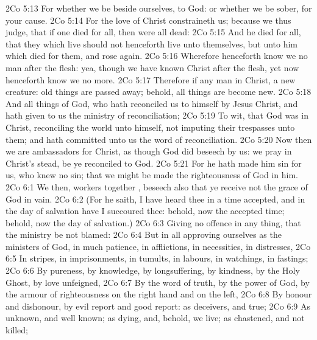 \vs 2Co 5:13 For whether we be beside ourselves,  to God: or whether we be sober,  for your cause.
\vs 2Co 5:14 For the love of Christ constraineth us; because we thus judge, that if one died for all, then were all dead:
\vs 2Co 5:15 And  he died for all, that they which live should not henceforth live unto themselves, but unto him which died for them, and rose again.
\vs 2Co 5:16 Wherefore henceforth know we no man after the flesh: yea, though we have known Christ after the flesh, yet now henceforth know we  no more.
\vs 2Co 5:17 Therefore if any man  in Christ,  a new creature: old things are passed away; behold, all things are become new.
\vs 2Co 5:18 And all things  of God, who hath reconciled us to himself by Jesus Christ, and hath given to us the ministry of reconciliation;
\vs 2Co 5:19 To wit, that God was in Christ, reconciling the world unto himself, not imputing their trespasses unto them; and hath committed unto us the word of reconciliation.
\vs 2Co 5:20 Now then we are ambassadors for Christ, as though God did beseech  by us: we pray  in Christ's stead, be ye reconciled to God.
\vs 2Co 5:21 For he hath made him  sin for us, who knew no sin; that we might be made the righteousness of God in him.
\vs 2Co 6:1 We then,  workers together , beseech  also that ye receive not the grace of God in vain.
\vs 2Co 6:2 (For he saith, I have heard thee in a time accepted, and in the day of salvation have I succoured thee: behold, now  the accepted time; behold, now  the day of salvation.)
\vs 2Co 6:3 Giving no offence in any thing, that the ministry be not blamed:
\vs 2Co 6:4 But in all  approving ourselves as the ministers of God, in much patience, in afflictions, in necessities, in distresses,
\vs 2Co 6:5 In stripes, in imprisonments, in tumults, in labours, in watchings, in fastings;
\vs 2Co 6:6 By pureness, by knowledge, by longsuffering, by kindness, by the Holy Ghost, by love unfeigned,
\vs 2Co 6:7 By the word of truth, by the power of God, by the armour of righteousness on the right hand and on the left,
\vs 2Co 6:8 By honour and dishonour, by evil report and good report: as deceivers, and  true;
\vs 2Co 6:9 As unknown, and  well known; as dying, and, behold, we live; as chastened, and not killed;
